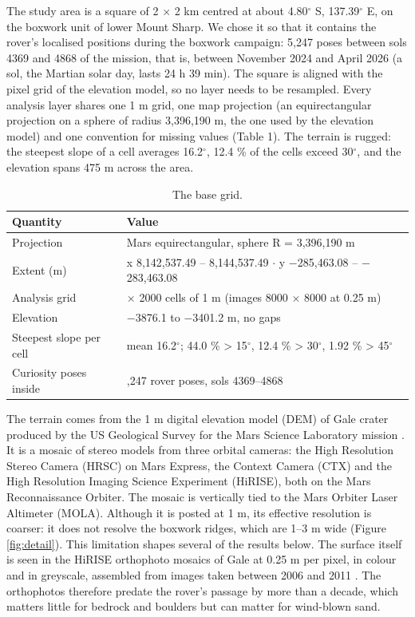 \documentclass[11pt,a4paper]{article}
\begin{document}
The study area is a square of 2 $\times$ 2 km centred at about 4.80$^\circ$ S, 137.39$^\circ$ E, on the boxwork unit of lower Mount Sharp. We chose it so that it contains the rover's localised positions during the boxwork campaign: 5,247 poses between sols 4369 and 4868 of the mission, that is, between November 2024 and April 2026 (a sol, the Martian solar day, lasts 24 h 39 min). The square is aligned with the pixel grid of the elevation model, so no layer needs to be resampled. Every analysis layer shares one 1 m grid, one map projection (an equirectangular projection on a sphere of radius 3,396,190 m, the one used by the elevation model) and one convention for missing values (Table 1). The terrain is rugged: the steepest slope of a cell averages 16.2$^\circ$, 12.4 \% of the cells exceed 30$^\circ$, and the elevation spans 475 m across the area.

\begin{table}[H]
\centering\small
\caption{The base grid.}
\begin{tabularx}{\linewidth}{>{\raggedright\arraybackslash}X>{\raggedright\arraybackslash}X}
\toprule
Quantity & Value \\
\midrule
Projection & Mars equirectangular, sphere R = 3,396,190 m \\
Extent (m) & x 8,142,537.49 -- 8,144,537.49 $\cdot$ y $-$285,463.08 -- $-$283,463.08 \\
Analysis grid & 2000 $\times$ 2000 cells of 1 m (images 8000 $\times$ 8000 at 0.25 m) \\
Elevation & $-$3876.1 to $-$3401.2 m, no gaps \\
Steepest slope per cell & mean 16.2$^\circ$; 44.0 \% > 15$^\circ$, 12.4 \% > 30$^\circ$, 1.92 \% > 45$^\circ$ \\
Curiosity poses inside & 5,247 rover poses, sols 4369--4868 \\
\bottomrule
\end{tabularx}
\end{table}

The terrain comes from the 1 m digital elevation model (DEM) of Gale crater produced by the US Geological Survey for the Mars Science Laboratory mission \cite{Parker2016}. It is a mosaic of stereo models from three orbital cameras: the High Resolution Stereo Camera (HRSC) on Mars Express, the Context Camera (CTX) and the High Resolution Imaging Science Experiment (HiRISE), both on the Mars Reconnaissance Orbiter. The mosaic is vertically tied to the Mars Orbiter Laser Altimeter (MOLA). Although it is posted at 1 m, its effective resolution is coarser: it does not resolve the boxwork ridges, which are 1--3 m wide (Figure \ref{fig:detail}). This limitation shapes several of the results below. The surface itself is seen in the HiRISE orthophoto mosaics of Gale at 0.25 m per pixel, in colour and in greyscale, assembled from images taken between 2006 and 2011 \cite{HiRISE-Gale}. The orthophotos therefore predate the rover's passage by more than a decade, which matters little for bedrock and boulders but can matter for wind-blown sand.
\end{document}
